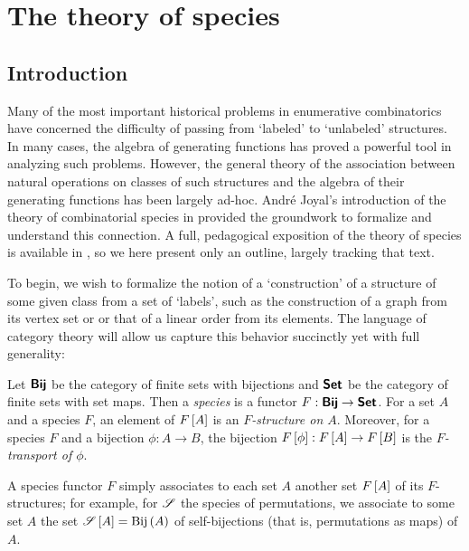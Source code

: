 \documentclass[distribution,draft]{brandiss} %
\numberwithin{section}{chapter}
\numberwithin{figure}{chapter}
\begin{document}
\listoftables %

\mainmatter

\chapter{The theory of species}\label{c:species}
\section{Introduction}\label{s:introspec}
Many of the most important historical problems in enumerative combinatorics have concerned the difficulty of passing from `labeled' to `unlabeled' structures.
In many cases, the algebra of generating functions has proved a powerful tool in analyzing such problems.
However, the general theory of the association between natural operations on classes of such structures and the algebra of their generating functions has been largely ad-hoc.
Andr\'{e} Joyal's introduction of the theory of combinatorial species in \cite{joy:species} provided the groundwork to formalize and understand this connection.
A full, pedagogical exposition of the theory of species is available in \cite{bll:species}, so we here present only an outline, largely tracking that text.

To begin, we wish to formalize the notion of a `construction' of a structure of some given class from a set of `labels', such as the construction of a graph from its vertex set or or that of a linear order from its elements.
The language of category theory will allow us capture this behavior succinctly yet with full generality:
\begin{definition}\label{def:species}
  Let $\boldsymbol{\mathsf{Bij}}$ be the category of finite sets with bijections and $\boldsymbol{\mathsf{Set}}$ be the category of finite sets with set maps.
  Then a \emph{species} is a functor $F: \boldsymbol{\mathsf{Bij}} \to \boldsymbol{\mathsf{Set}}$.
  For a set $A$ and a species $F$, an element of $F \left[ {A} \right]$ is an \emph{$F$-structure on $A$}.
  Moreover, for a species $F$ and a bijection $\phi: A \to B$, the bijection $F \left[ {\phi} \right]: F \left[ {A} \right] \to F \left[ {B} \right]$ is the \emph{$F$-transport of $\phi$}.
\end{definition}
A species functor $F$ simply associates to each set $A$ another set $F \left[ {A} \right]$ of its $F$-structures; for example, for $\mathscr{S}$ the species of permutations, we associate to some set $A$ the set $\mathscr{S} \left[ {A} \right] = \operatorname{Bij} \left( {A} \right)$ of self-bijections (that is, permutations as maps) of $A$.
\end{document}
